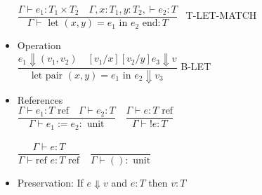 \documentclass[12pt]{article}
\begin{document}
\begin{multicols}{2}
\begin{itemize}[noitemsep, nosep]
    $\dfrac{\Gamma \vdash e_1: T_1 \times T_2 \quad \Gamma, x: T_1, y: T_2, \vdash e_2: T}{\Gamma \vdash \text{ let } (x, y) = e_1 \text{ in } e_2 \text{ end}: T}$ \, T-LET-MATCH
    \item Operation \\
    $\dfrac{e_1 \Downarrow (v_1, v_2) \quad [v_1/x][v_2/y]e_3 \Downarrow v}{\text{let pair } (x, y) = e_1 \text{ in } e_2 \Downarrow v_3}$ B-LET
    \item References \\
    \vspace{1mm}
    $\dfrac{\Gamma \vdash e_1 : T \text{ ref} \quad \Gamma \vdash e_2 : T}{\Gamma \vdash e_1 := e_2 : \text{ unit}} \quad 
    \dfrac{\Gamma \vdash e : T \text{ ref}}{\Gamma \vdash !e : T}$ \\~\\
    $\dfrac{\Gamma \vdash e : T}{\Gamma \vdash \text{ref } e : T \text{ ref}} \quad
    \dfrac{}{\Gamma \vdash ()  : \text{ unit}}$
    \item Preservation: If $e \Downarrow v$ and $e : T$ then $v : T$
    
\end{itemize}

\end{multicols}
\end{document}
